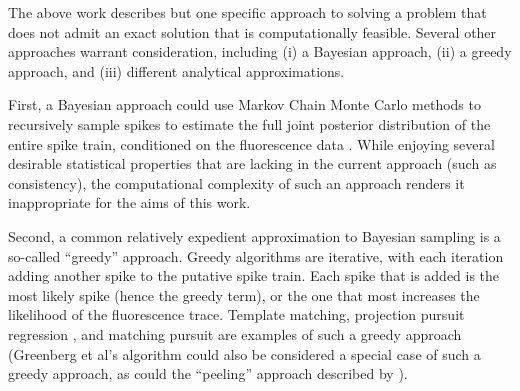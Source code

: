 The above work describes but one specific approach to solving a problem that does not admit an exact solution that is computationally feasible.  Several other approaches warrant consideration, including (i) a Bayesian approach, (ii) a greedy approach, and (iii) different analytical approximations.   

First, a Bayesian approach could use Markov Chain Monte Carlo methods to recursively sample spikes to estimate the full joint posterior distribution of the entire spike train, conditioned on the fluorescence data %
\cite{AndrieuDoucet01,MishchenkoPaninski09,JouclaPouzat10}.  While enjoying several desirable statistical properties that are lacking in the current approach (such as consistency), the computational complexity of such an approach renders it inappropriate for the aims of this work.  

Second, a common relatively expedient approximation to Bayesian sampling is a so-called ``greedy'' approach.  Greedy algorithms are iterative, with each iteration adding another spike to the putative spike train. Each spike that is added is the most likely spike (hence the greedy term), or the one that most increases the likelihood of the fluorescence trace.  
Template matching, projection pursuit regression \cite{FS81}, and matching pursuit \cite{MallatZhang93} are examples of such a greedy approach (Greenberg et al's algorithm \cite{GreenbergKerr08} could also be considered a special case of such a greedy approach, as could the ``peeling'' approach described by \cite{GreweHelmchen10}).  


